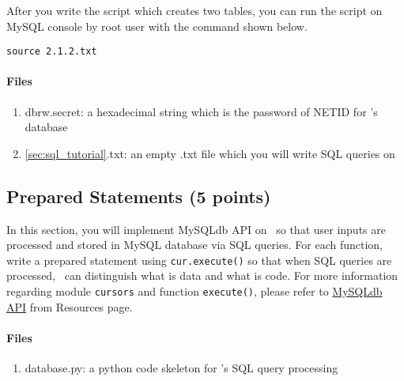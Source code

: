 \documentclass[letterpaper,12pt]{report}
\begin{document}
After you write the script which creates two tables, you can run the script on MySQL console by root user with the command shown below.
\begin{mdframed}
\begin{Verbatim}
source 2.1.2.txt
\end{Verbatim}
\end{mdframed}

\paragraph{Files}
\begin{enumerate}
\item dbrw.secret: a hexadecimal string which is the password of NETID for \bungle's database
\item \ref{sec:sql_tutorial}.txt: an empty .txt file which you will write SQL queries on
\end{enumerate}

\subsection{Prepared Statements (5 points)}
\label{sec:ps_tutorial}
In this section, you will implement MySQLdb API on \bungle\ so that user inputs are processed and stored in MySQL database via SQL queries. For each function, write a prepared statement using \texttt{cur.execute()} so that when SQL queries are processed, \bungle\ can distinguish what is data and what is code. For more information regarding module \texttt{cursors} and function \texttt{execute()}, please refer to \href{http://mysql-python.sourceforge.net/MySQLdb-1.2.2/}{MySQLdb API} from Resources page.
 
\paragraph{Files}
\begin{enumerate}
\item database.py: a python code skeleton for \bungle's SQL query processing
\end{enumerate}
\end{document}
